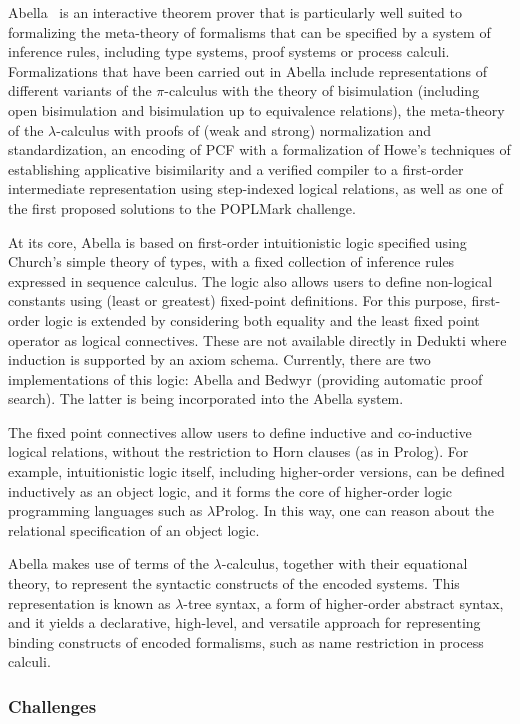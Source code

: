 Abella~\cite{baelde:abella} is an interactive theorem prover that is
particularly well suited to formalizing the meta-theory of formalisms that can
be specified by a system of inference rules, including type systems, proof
systems or process calculi. Formalizations that have been carried out in Abella
include representations of different variants of the $\pi$-calculus with
the theory of bisimulation (including open bisimulation and bisimulation up to
equivalence relations), the meta-theory of the $\lambda$-calculus with proofs of
(weak and strong) normalization and standardization, an encoding of PCF with a
formalization of Howe's techniques of establishing applicative bisimilarity and
a verified compiler to a first-order intermediate representation using
step-indexed logical relations, as well as one of the first proposed solutions
to the POPLMark challenge.

At its core, Abella is based on first-order intuitionistic logic specified using
Church's simple theory of types, with a fixed collection of inference rules
expressed in sequence calculus. The logic also allows users to define
non-logical constants using (least or greatest) fixed-point definitions. For
this purpose, first-order logic is extended by considering both equality and the
least fixed point operator as logical connectives. These are not available
directly in Dedukti where induction is supported by an axiom schema. Currently,
there are two implementations of this logic: Abella and Bedwyr (providing
automatic proof search). The latter is being incorporated into the Abella
system.

The fixed point connectives allow users to define inductive and co-inductive
logical relations, without the restriction to Horn clauses (as in Prolog). For
example, intuitionistic logic itself, including higher-order versions, can be
defined inductively as an object logic, and it forms the core of higher-order
logic programming languages such as $\lambda$Prolog. In this way, one can reason
about the relational specification of an object logic.

Abella makes use of terms of the $\lambda$-calculus, together with their
equational theory, to represent the syntactic constructs of the encoded systems.
This representation is known as $\lambda$-tree syntax, a form of higher-order
abstract syntax, and it yields a declarative, high-level, and versatile approach
for representing binding constructs of encoded formalisms, such as name
restriction in process calculi.


\subsubsection*{Challenges}

